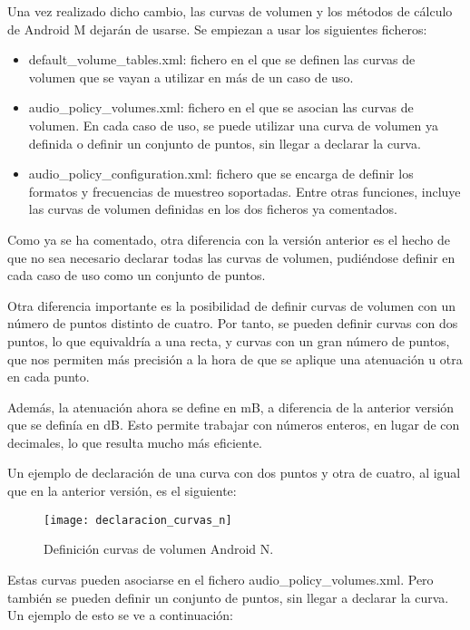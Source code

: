 Una vez realizado dicho cambio, las curvas de volumen y los métodos de cálculo de Android M dejarán de usarse. Se empiezan a usar los siguientes ficheros:
\begin{itemize}
	\item{default\_volume\_tables.xml: fichero en el que se definen las curvas de volumen que se vayan a utilizar en más de un caso de uso.}
	\item{audio\_policy\_volumes.xml: fichero en el que se asocian las curvas de volumen. En cada caso de uso, se puede utilizar una curva de volumen ya definida o definir un conjunto de puntos, sin llegar a declarar la curva.}
	\item{audio\_policy\_configuration.xml: fichero que se encarga de definir los formatos y frecuencias de muestreo soportadas. Entre otras funciones, incluye las curvas de volumen definidas en los dos ficheros ya comentados.}
\end{itemize}

Como ya se ha comentado, otra diferencia con la versión anterior es el hecho de que no sea necesario declarar todas las curvas de volumen, pudiéndose definir en cada caso de uso como un conjunto de puntos.

Otra diferencia importante es la posibilidad de definir curvas de volumen con un número de puntos distinto de cuatro. Por tanto, se pueden definir curvas con dos puntos, lo que equivaldría a una recta, y curvas con un gran número de puntos, que nos permiten más precisión a la hora de que se aplique una atenuación u otra en cada punto.

Además, la atenuación ahora se define en \gls{mB}, a diferencia de la anterior versión que se definía en \gls{dB}. Esto permite trabajar con números enteros, en lugar de con decimales, lo que resulta mucho más eficiente.

Un ejemplo de declaración de una curva con dos puntos y otra de cuatro, al igual que en la anterior versión, es el siguiente:

\begin{figure}[H]
	\centering
	\texttt{[image: declaracion\_curvas\_n]}
	\caption{Definición curvas de volumen Android N.}
	\label{fig:declaracion_curvas_n}
\end{figure}

Estas curvas pueden asociarse en el fichero audio\_policy\_volumes.xml. Pero también se pueden definir un conjunto de puntos, sin llegar a declarar la curva. Un ejemplo de esto se ve a continuación:

